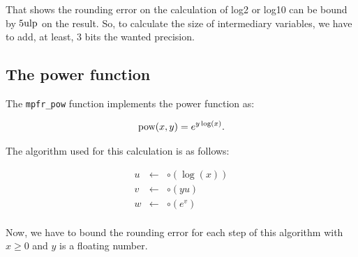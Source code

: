 \documentclass[12pt]{amsart}
\def\ulp{{\rm ulp}}
\begin{document}
That shows the rounding error on the calculation of log2 or
log10 can be bound by $5 \ulp$ on the result. So, to calculate the
size of intermediary variables, we have to add, at least, 3 bits the
wanted precision.

\subsection{The power function}

The {\tt mpfr\_pow} function implements the power function  as:

\[
\textnormal{pow} (x,y) = e^{y \log(x)}.
\]

The algorithm used for this calculation is as follows:

\begin{eqnarray}\nonumber
u&\leftarrow&\circ(\log(x))\\\nonumber
v&\leftarrow&\circ(y u)\\\nonumber
w&\leftarrow&\circ(e^v)\\\nonumber
\end{eqnarray}

Now, we have to bound the rounding error for each step of this
algorithm with $x \geq 0$ and $y$ is a floating number.
\end{document}
